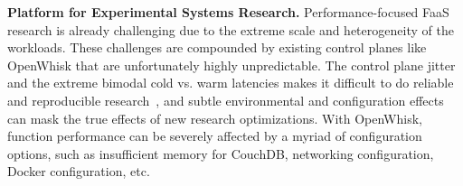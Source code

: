 \noindent \textbf{Platform for Experimental Systems Research.}
%
Performance-focused FaaS research is already challenging due to the extreme scale and heterogeneity of the workloads.
These challenges are compounded by existing control planes like OpenWhisk that are unfortunately highly unpredictable.
The control plane jitter and the extreme bimodal cold vs. warm latencies makes it difficult to do reliable and reproducible research~\cite{mytkowicz2009producing}, and subtle environmental and configuration effects can mask the true effects of new research optimizations. 
With OpenWhisk, function performance can be severely affected by a myriad of configuration options, such as insufficient memory for CouchDB, networking configuration, Docker configuration, etc. 

